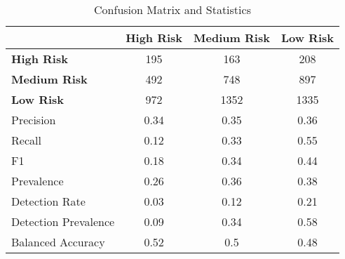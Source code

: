 \begin{table}[!htbp]
    \small
    \centering
    \caption{Confusion Matrix and Statistics}
    \label{tab:confusion}
    \begin{tabular}{lccc}
        \toprule
        & \textbf{High Risk} & \textbf{Medium Risk} & \textbf{Low Risk} \\
        \midrule
        \textbf{High Risk} & 195 & 163 & 208 \\
        \textbf{Medium Risk} & 492 & 748 & 897 \\
        \textbf{Low Risk} & 972 & 1352 & 1335 \\
        \bottomrule
        \midrule
        Precision & 0.34 & 0.35 & 0.36 \\
        Recall & 0.12 & 0.33 & 0.55 \\
        F1 & 0.18 & 0.34 & 0.44 \\
        Prevalence & 0.26 & 0.36 & 0.38 \\
        Detection Rate & 0.03 & 0.12 & 0.21 \\
        Detection Prevalence & 0.09 & 0.34 & 0.58 \\
        Balanced Accuracy & 0.52 & 0.5 & 0.48 \\
        \bottomrule
    \end{tabular}
\end{table}